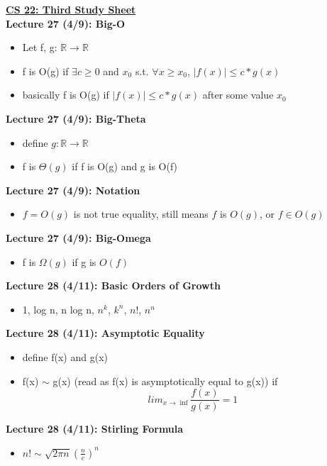 \documentclass[twocolumn]{article}
\begin{document}
\textbf{\underline{CS 22: Third Study Sheet}} \\

\textbf{Lecture 27 (4/9): Big-O}
\begin{itemize}
    \item Let f, g: $\mathbb{R} \rightarrow \mathbb{R}$
    \item f is O(g) if $\exists c \geq 0$ and $x_0$ s.t. $\forall x \geq x_0$, $|f(x)| \leq c*g(x)$
    \item basically f is O(g) if $|f(x)|\leq c * g(x)$ after some value $x_0$
\end{itemize}

\textbf{Lecture 27 (4/9): Big-Theta}
\begin{itemize}
    \item define $g: \mathbb{R} \rightarrow \mathbb{R}$
    \item f is $\Theta(g)$ if f is O(g) and g is O(f)
\end{itemize}

\textbf{Lecture 27 (4/9): Notation}
\begin{itemize}
    \item $f=O(g)$ is not true equality, still means $f$ is $O(g)$, or $f \in O(g)$
\end{itemize}

\textbf{Lecture 27 (4/9): Big-Omega}
\begin{itemize}
    \item f is $\Omega(g)$ if g is $O(f)$
\end{itemize}

\textbf{Lecture 28 (4/11): Basic Orders of Growth}
\begin{itemize}
    \item 1, log n, n log n, $n^k$, $k^n$, $n!$, $n^n$
\end{itemize}

\textbf{Lecture 28 (4/11): Asymptotic Equality}
\begin{itemize}
    \item define f(x) and g(x)
    \item f(x) $\sim$ g(x) (read as f(x) is asymptotically equal to g(x)) if $$lim_{x \rightarrow \inf} \frac{f(x)}{g(x)} = 1$$
\end{itemize}

\textbf{Lecture 28 (4/11): Stirling Formula}
\begin{itemize}
    \item $n! \sim \sqrt{2 \pi n}(\frac{n}{e})^{n}$
\end{itemize}
\end{document}
